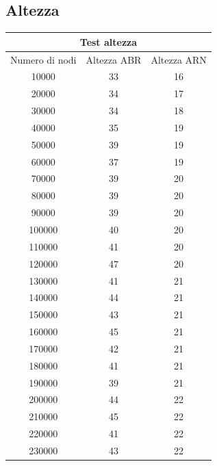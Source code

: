 \documentclass{article}
\begin{document}
\subsection{Altezza}
{\centering}
{\renewcommand{\arraystretch}{0.9}}
\begin{longtable}{c|c|c}
\hline
\multicolumn{3}{c}{Test altezza}\\
\hline
   Numero di nodi &   Altezza ABR &   Altezza ARN \\
\hline
            10000 &            33 &            16 \\
            20000 &            34 &            17 \\
            30000 &            34 &            18 \\
            40000 &            35 &            19 \\
            50000 &            39 &            19 \\
            60000 &            37 &            19 \\
            70000 &            39 &            20 \\
            80000 &            39 &            20 \\
            90000 &            39 &            20 \\
           100000 &            40 &            20 \\
           110000 &            41 &            20 \\
           120000 &            47 &            20 \\
           130000 &            41 &            21 \\
           140000 &            44 &            21 \\
           150000 &            43 &            21 \\
           160000 &            45 &            21 \\
           170000 &            42 &            21 \\
           180000 &            41 &            21 \\
           190000 &            39 &            21 \\
           200000 &            44 &            22 \\
           210000 &            45 &            22 \\
           220000 &            41 &            22 \\
           230000 &            43 &            22 \\

\end{longtable}
\end{document}
